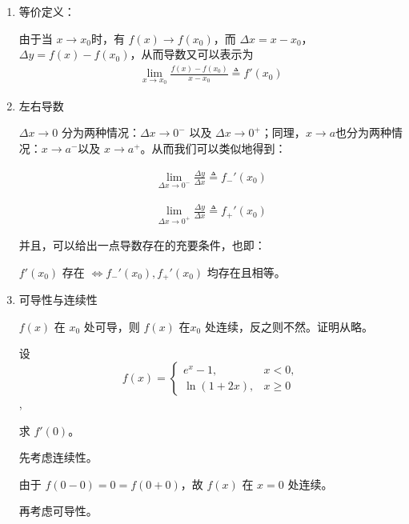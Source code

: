 \begin{note}
    \begin{enumerate}
        \item 等价定义：
        
        由于当 $x \to x_0$时，有 $f(x) \to f(x_0)$，而 $\Delta x =x-x_0$，$\Delta y = f(x)-f(x_0)$，从而导数又可以表示为
        \begin{align}
            \lim_{x \to x_0}\frac{ f(x)-f(x_0)}{x-x_0}\triangleq f'(x_0)
        \end{align}
        \item 左右导数
        
        $\Delta x \to 0$ 分为两种情况：$\Delta x  \to 0^{-}$ 以及
        $\Delta x  \to 0^{+}$；同理，$ x \to a$也分为两种情况：$ x \to a^{-}$以及 $ x \to a^{+}$。从而我们可以类似地得到：

        \begin{align}
            \lim_{\Delta x \to 0^{-}}\frac{\Delta y}{\Delta x} \triangleq f_{-}'(x_0) 
       \end{align}

       \begin{align}
           \lim_{\Delta x \to 0^{+}}\frac{\Delta y}{\Delta x} \triangleq f_{+}'(x_0) 
       \end{align}

        并且，可以给出一点导数存在的充要条件，也即：

        $f'(x_0)$ 存在 $\Leftrightarrow f_{-}'(x_0),f_{+}'(x_0) $ 均存在且相等。

        \item 可导性与连续性
        
        $f(x)$ 在 $x_0$ 处可导，则 $f(x)$ 在$x_0$ 处连续，反之则不然。证明从略。
        \begin{example}
            设 \[f(x) = \begin{cases}
                e^x-1, & x<0,\\
                \ln(1+2x), & x \ge 0
            \end{cases}\],
            
            求 $f'(0)$。
        \end{example}
        
        \begin{solution}
            先考虑连续性。
        
            由于 $f(0-0)=0=f(0+0)$，故 $f(x)$ 在 $x=0$ 处连续。
        
            再考虑可导性。
        

\end{solution}
\end{enumerate}
\end{note}
